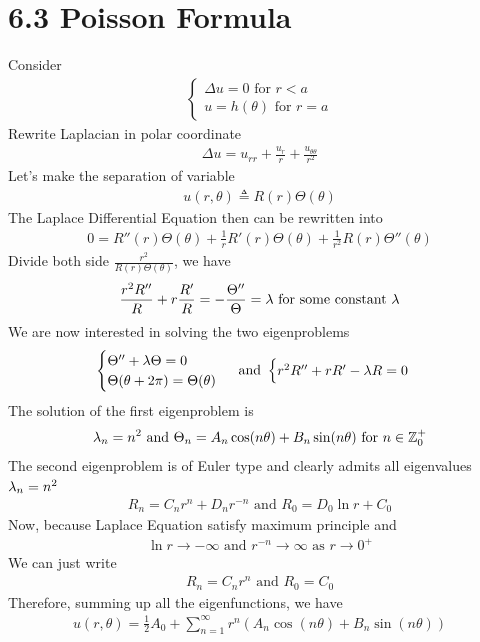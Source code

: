 \documentclass{report}
\begin{document}
\section{6.3 Poisson Formula}
\begin{mdframed}
Consider 
\begin{align*}
\begin{cases}
  \Delta u =0 \text{ for }r<a  \\
  u= h(\theta)\text{ for }r=a
\end{cases}
\end{align*}
Rewrite Laplacian in polar coordinate  
\begin{align*}
\Delta u= u_{rr}+ \frac{u_r}{r}+ \frac{u_{\theta \theta}}{r^2}
\end{align*}
Let's make the separation of variable 
\begin{align*}
u(r,\theta)\triangleq  R(r) \Theta (\theta)
\end{align*}
The Laplace Differential Equation then can be rewritten into  
\begin{align*}
0=R''(r)\Theta  (\theta)+ \frac{1}{r}R'(r)\Theta  (\theta)+ \frac{1}{r^2}R(r)\Theta  ''(\theta)
\end{align*}
Divide both side $\frac{r^2}{R(r)\Theta (\theta)}$, we have 
\begin{align*}
\frac{r^2R''}{R}+ r \frac{R'}{R}= - \frac{\Theta  ''}{\Theta }= \lambda \text{ for some constant  }\lambda 
\end{align*}
We are now interested in solving the two eigenproblems 
\begin{align*}
\begin{cases}
  \Theta '' + \lambda  \Theta =0 \\
  \Theta  (\theta + 2\pi )= \Theta  (\theta) 
\end{cases} \text{ and }\begin{cases}
  r^2R''+ rR' - \lambda  R=0
\end{cases}
\end{align*}
The solution of the first eigenproblem is 
\begin{align*}
  \lambda _n=n^2 \text{ and }\Theta _n = A_n \cos (n \theta)+ B_n \sin (n \theta)\text{ for }n \in\mathbb{Z}_0^+
\end{align*}
The second eigenproblem is of Euler type and clearly admits all eigenvalues  $\lambda _n=n^2$ 
\begin{align*}
R_n=C_nr^n + D_n r^{-n}\text{ and }R_0= D_0\ln r + C_0
\end{align*}
Now, because Laplace Equation satisfy maximum principle and 
 \begin{align*}
\ln r\to -\infty \text{ and }r^{-n}\to \infty \text{ as }r\to 0^+
\end{align*}
We can just write 
\begin{align*}
R_n=C_nr^n \text{ and }R_0=C_0
\end{align*}
Therefore, summing up all the eigenfunctions, we have  
\begin{align*}
u(r,\theta)= \frac{1}{2}A_0 + \sum_{n=1}^{\infty} r^n (A_n \cos (n \theta)+ B_n \sin (n\theta))
\end{align*}
\end{mdframed}
\end{document}
